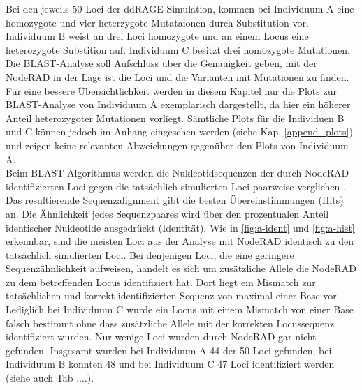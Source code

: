 Bei den jeweils 50 Loci der ddRAGE-Simulation, kommen bei Individuum A eine homozygote und vier heterzygote Mutataionen durch Substitution vor. Individuum B weist an drei Loci homozygote und an einem Locus eine heterozygote Substition auf. Individuum C besitzt drei homozygote Mutationen. Die BLAST-Analyse soll Aufschluss über die Genauigkeit geben, mit der NodeRAD in der Lage ist die Loci und die Varianten mit Mutationen zu finden. Für eine bessere Übersichtlichkeit werden in diesem Kapitel nur die Plots zur BLAST-Analyse von Individuum A exemplarisch dargestellt, da hier ein höherer Anteil heterozygoter Mutationen vorliegt. Sämtliche Plots für die Individuen B und C können jedoch im Anhang eingesehen werden (siehe Kap. \ref{append_plots}) und zeigen keine relevanten Abweichungen gegenüber den Plots von Individuum A.\\

Beim BLAST-Algorithmus werden die Nukleotidsequenzen der durch NodeRAD identifizierten Loci gegen die tatsächlich simulierten Loci paarweise verglichen \cite{gaedeke_2007}. Das resultierende Sequenzalignment gibt die besten Übereinstimmungen (Hits) an. Die Ähnlichkeit jedes Sequenzpaares wird über den prozentualen Anteil identischer Nukleotide ausgedrückt (Identität). Wie in \autoref{fig:a-ident} und \autoref{fig:a-hist} erkennbar, sind die meisten Loci aus der Analyse mit NodeRAD identisch zu den tatsächlich simulierten Loci. Bei denjenigen Loci, die eine geringere Sequenzähnlichkeit aufweisen, handelt es sich um zusätzliche Allele die NodeRAD zu dem betreffenden Locus identifiziert hat. Dort liegt ein Mismatch zur tatsächlichen und korrekt identifizierten Sequenz von maximal einer Base vor. Lediglich bei Individuum C wurde ein Locus mit einem Mismatch von einer Base falsch bestimmt ohne dass zusätzliche Allele mit der korrekten Locussequenz identifiziert wurden. Nur wenige Loci wurden durch NodeRAD gar nicht gefunden. Insgesamt wurden bei Individuum A 44 der 50 Loci gefunden, bei Individuum B konnten 48 und bei Individuum C 47 Loci identifiziert werden (siehe auch Tab ....).\\

\newpage

